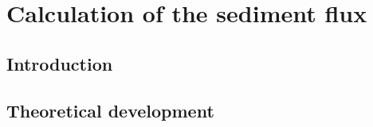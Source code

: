 
\chapter{Calculation of the sediment flux}

\section{Introduction}
\section{Theoretical development}
